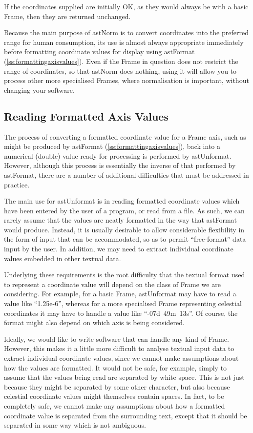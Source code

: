 \documentclass[twoside,11pt]{article}
\newcommand{\htmlref}[2]{#1}
\newcommand{\secref}[1]{\S\ref{#1}}
\renewcommand{\secref}[1]{\ref{#1}}
\begin{document}
If the coordinates supplied are initially OK, as they would always be
with a basic Frame, then they are returned unchanged.

Because the main purpose of astNorm is to convert coordinates into the
preferred range for human consumption, its use is almost always
appropriate immediately before formatting coordinate values for
display using \htmlref{astFormat}{astFormat} (\secref{ss:formattingaxisvalues}). Even if
the Frame in question does not restrict the range of coordinates, so
that astNorm does nothing, using it will allow you to process other
more specialised Frames, where normalisation is important, without
changing your software.

\subsection{\label{ss:unformattingaxisvalues}Reading Formatted Axis Values}

The process of converting a formatted coordinate value for a \htmlref{Frame}{Frame}
axis, such as might be produced by \htmlref{astFormat}{astFormat}
(\secref{ss:formattingaxisvalues}), back into a numerical (double)
value ready for processing is performed by \htmlref{astUnformat}{astUnformat}.  However,
although this process is essentially the inverse of that performed by
astFormat, there are a number of additional difficulties that must be
addressed in practice.

The main use for astUnformat is in reading formatted coordinate values
which have been entered by the user of a program, or read from a
file. As such, we can rarely assume that the values are neatly
formatted in the way that astFormat would produce. Instead, it is
usually desirable to allow considerable flexibility in the form of
input that can be accommodated, so as to permit ``free-format'' data
input by the user. In addition, we may need to extract individual
coordinate values embedded in other textual data.

Underlying these requirements is the root difficulty that the textual
format used to represent a coordinate value will depend on the class
of Frame we are considering. For example, for a basic Frame,
astUnformat may have to read a value like ``1.25e-6'', whereas for a
more specialised Frame representing celestial coordinates it may have
to handle a value like ``-07d~49m~13s''. Of course, the format might
also depend on which axis is being considered.

Ideally, we would like to write software that can handle any kind of
Frame. However, this makes it a little more difficult to analyse
textual input data to extract individual coordinate values, since we
cannot make assumptions about how the values are formatted. It would
not be safe, for example, simply to assume that the values being read
are separated by white space. This is not just because they might be
separated by some other character, but also because celestial
coordinate values might themselves contain spaces. In fact, to be
completely safe, we cannot make any assumptions about how a formatted
coordinate value is separated from the surrounding text, except that
it should be separated in some way which is not ambiguous.
\end{document}
